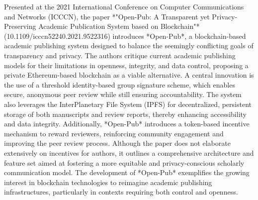 \documentclass{article}
\begin{document}

Presented at the 2021 International Conference on Computer Communications and Networks (ICCCN), the paper *"Open-Pub: A Transparent yet Privacy-Preserving Academic Publication System based on Blockchain"* (10.1109/icccn52240.2021.9522316) introduces *Open-Pub*, a blockchain-based academic publishing system designed to balance the seemingly conflicting goals of transparency and privacy. The authors critique current academic publishing models for their limitations in openness, integrity, and data control, proposing a private Ethereum-based blockchain as a viable alternative. A central innovation is the use of a threshold identity-based group signature scheme, which enables secure, anonymous peer review while still ensuring accountability. The system also leverages the InterPlanetary File System (IPFS) for decentralized, persistent storage of both manuscripts and review reports, thereby enhancing accessibility and data integrity. Additionally, *Open-Pub* introduces a token-based incentive mechanism to reward reviewers, reinforcing community engagement and improving the peer review process. Although the paper does not elaborate extensively on incentives for authors, it outlines a comprehensive architecture and feature set aimed at fostering a more equitable and privacy-conscious scholarly communication model. The development of *Open-Pub* exemplifies the growing interest in blockchain technologies to reimagine academic publishing infrastructures, particularly in contexts requiring both control and openness.

\end{document}
